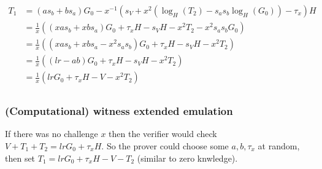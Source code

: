\begin{pproof}
\begin{pproof}
{\begin{align*}
        T_1 &= (as_b + bs_a)G_0 - x^{-1}(s_V  + x^2(\log_H(T_2) - s_as_b\log_H(G_0)) - \tau_x)H\\
            &= \frac{1}{x}((xas_b + xbs_a)G_0 + \tau_xH - s_VH - x^2T_2 - x^2s_as_bG_0)\\
            &= \frac{1}{x}((xas_b + xbs_a - x^2s_as_b)G_0 + \tau_xH - s_VH - x^2T_2)\\
            &= \frac{1}{x}((lr - ab)G_0 + \tau_xH - s_VH - x^2T_2)\\
            &= \frac{1}{x}(lr G_0 + \tau_xH - V - x^2T_2)\\
      \end{align*}}
  \end{pproof}
\end{pproof}


\subsubsection{(Computational) witness extended emulation}
If there was no challenge $x$ then the verifier would check  $V + T_1 + T_2 = lrG_0 + \tau_xH$.
So the prover could choose some $a, b, \tau_x$ at random, then set $T_1 = lrG_0 + \tau_xH - V - T_2$ (similar to zero knwledge).

